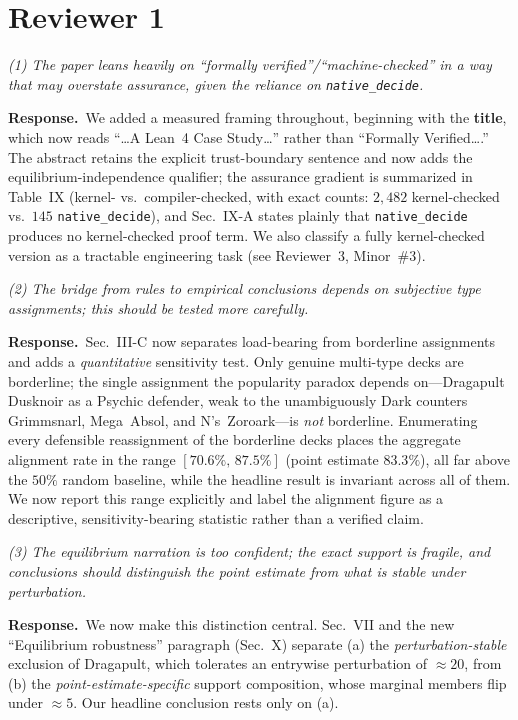 \documentclass[11pt]{article}
\newcommand{\cmt}[1]{\par\smallskip\noindent\textit{#1}\par\smallskip}
\newcommand{\resp}{\par\noindent\textbf{Response.}\ }
\begin{document}
\hrulefill

\section*{Reviewer 1}

\cmt{(1) The paper leans heavily on ``formally verified''/``machine-checked'' in a
way that may overstate assurance, given the reliance on \texttt{native\_decide}.}
\resp We added a measured framing throughout, beginning with the \textbf{title},
which now reads ``\ldots A Lean~4 Case Study\ldots'' rather than ``Formally
Verified\ldots.'' The abstract retains the explicit
trust-boundary sentence and now adds the equilibrium-independence qualifier; the
assurance gradient is summarized in Table~IX (kernel- vs.\ compiler-checked, with
exact counts: $2{,}482$ kernel-checked vs.\ $145$ \texttt{native\_decide}), and
Sec.~IX-A states plainly that \texttt{native\_decide} produces no kernel-checked
proof term. We also classify a fully kernel-checked version as a tractable
engineering task (see Reviewer~3, Minor~\#3).

\cmt{(2) The bridge from rules to empirical conclusions depends on subjective type
assignments; this should be tested more carefully.}
\resp Sec.~III-C now separates load-bearing from borderline assignments and adds a
\emph{quantitative} sensitivity test. Only genuine multi-type decks are borderline;
the single assignment the popularity paradox depends on---Dragapult Dusknoir as a
Psychic defender, weak to the unambiguously Dark counters Grimmsnarl, Mega~Absol,
and N's~Zoroark---is \emph{not} borderline. Enumerating every defensible
reassignment of the borderline decks places the aggregate alignment rate in the
range $[70.6\%,\,87.5\%]$ (point estimate $83.3\%$), all far above the $50\%$
random baseline, while the headline result is invariant across all of them. We now
report this range explicitly and label the alignment figure as a descriptive,
sensitivity-bearing statistic rather than a verified claim.

\cmt{(3) The equilibrium narration is too confident; the exact support is fragile,
and conclusions should distinguish the point estimate from what is stable under
perturbation.}
\resp We now make this distinction central. Sec.~VII and the new ``Equilibrium
robustness'' paragraph (Sec.~X) separate (a) the \emph{perturbation-stable}
exclusion of Dragapult, which tolerates an entrywise perturbation of
$\approx 20$\textperthousand, from (b) the \emph{point-estimate-specific} support
composition, whose marginal members flip under $\approx 5$\textperthousand. Our
headline conclusion rests only on (a).
\end{document}
